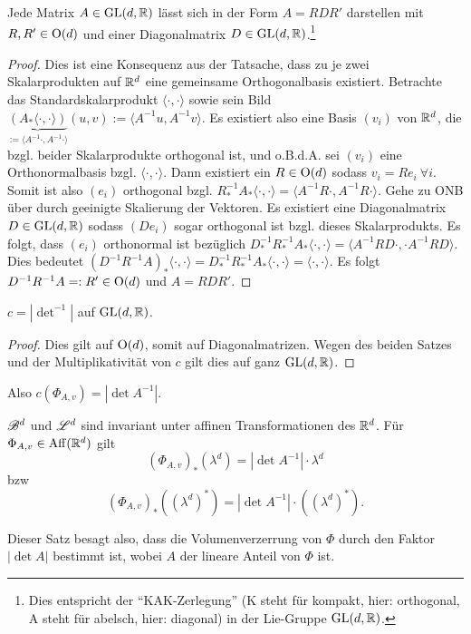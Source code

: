 \begin{satz}
Jede Matrix $A\in \operatorname{GL}(d,\mathbb{R})$ lässt sich in der Form $A=RDR'$ darstellen mit $R,R'\in \operatorname{O}(d)$ und einer Diagonalmatrix $D\in \operatorname{GL}(d,\mathbb{R})$.\footnote{Dies entspricht der ``KAK-Zerlegung'' (K steht für kompakt, hier: orthogonal, A steht für abelsch, hier: diagonal) in der Lie-Gruppe $\operatorname{GL}(d,\mathbb{R})$.}
\begin{proof}
Dies ist eine Konsequenz aus der Tatsache, dass zu je zwei Skalarprodukten auf $\mathbb{R}^d$ eine gemeinsame Orthogonalbasis existiert. Betrachte das Standardskalarprodukt $\langle \cdot, \cdot \rangle$ sowie sein Bild $\underbrace{(A_* \langle \cdot, \cdot \rangle)}_{:= \langle A^{-1} \cdot ,A^{-1}\cdot \rangle}(u,v):= \langle A^{-1}u, A^{-1}v \rangle$. Es existiert also eine Basis $(v_i)$ von $\mathbb{R}^d$, die bzgl. beider Skalarprodukte orthogonal ist, und o.B.d.A. sei $(v_i)$ eine Orthonormalbasis bzgl. $\langle \cdot, \cdot \rangle$. Dann existiert ein $R \in \operatorname{O}(d)$ sodass $v_i = R e_i \ \forall i$.  Somit ist also $(e_i)$ orthogonal bzgl. $R^{-1}_*A_*\langle \cdot, \cdot \rangle = \langle A^{-1}R\cdot,A^{-1}R\cdot\rangle$. Gehe zu ONB über durch geeinigte Skalierung der Vektoren. Es existiert eine Diagonalmatrix $D\in \operatorname{GL} (d,\mathbb{R})$ sodass $(De_i)$ sogar orthogonal ist bzgl. dieses Skalarprodukts. Es folgt, dass $(e_i)$ orthonormal ist bezüglich $D^{-1}_* R^{-1}_* A_* \langle \cdot , \cdot \rangle = \langle A^{-1} RD\cdot ,\cdot A^{-1} RD\rangle$. Dies bedeutet $(D^{-1}R^{-1}A)_*\langle \cdot ,\cdot \rangle=D^{-1}_* R^{-1}_* A_* \langle \cdot ,\cdot \rangle = \langle \cdot, \cdot \rangle$. Es folgt $D^{-1}R^{-1}A =: R' \in \operatorname{O}(d)$ und $A=RDR'$.
\end{proof}
\end{satz}

\begin{korollar}
$c= |\det^{-1}|$ auf $\operatorname{GL}(d,\mathbb{R})$.
\begin{proof}
Dies gilt auf $\operatorname{O}(d)$, somit auf Diagonalmatrizen. Wegen des beiden Satzes und der Multiplikativität von $c$ gilt dies auf ganz $\operatorname{GL}(d,\mathbb{R})$.
\end{proof}
Also $c(\Phi_{A,v})=|\det A^{-1}|$.
\end{korollar}

\begin{satz}
\begin{mdframed}
$\mathscr{B}^d$ und $\mathscr{L}^d$ sind invariant unter affinen Transformationen des $\mathbb{R}^d$. Für $\Phi_{A,v} \in \operatorname{Aff}(\mathbb{R}^d)$ gilt
$$
(\Phi_{A,v})_*(\lambda^d)=|\det A^{-1}|\cdot \lambda^d
$$
bzw
$$
(\Phi_{A,v})_*((\lambda^d)^*)=|\det A^{-1}|\cdot ((\lambda^d)^*).
$$
\end{mdframed}
Dieser Satz besagt also, dass die Volumenverzerrung von $\Phi$ durch den Faktor $|\det A|$ bestimmt ist, wobei $A$ der lineare Anteil von $\Phi$ ist.
\end{satz}


